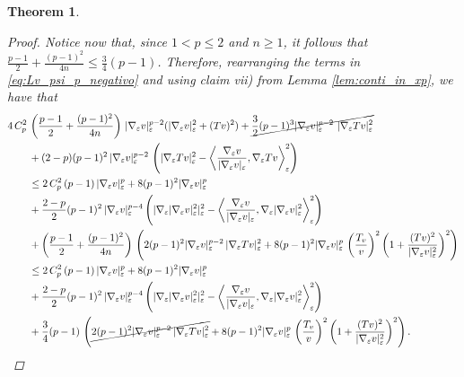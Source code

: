 \documentclass[10pt]{amsart}
\numberwithin{equation}{section}
\newtheorem{theorem}{Theorem}[section]
\theoremstyle{definition}
\begin{document}
\begin{theorem}
\begin{proof}
Notice now that, since $1<p \leq 2$ and $n\geq 1$, it follows that $\tfrac{p-1}{2} + \tfrac{(p-1)^{2}}{4n} \leq \tfrac{3}{4}(p-1)$. Therefore, rearranging the terms in \eqref{eq:Lv_psi_p_negativo} and using claim vii) from Lemma \ref{lem:conti_in_xp}, we have that
		\begin{equation}\label{eq:Rearranging}
			\begin{aligned}
				4\, C_{p}^{2}\, &\left(\dfrac{p-1}{2} + \dfrac{(p-1)^2}{4n}\right)\,  |\nabla_{\varepsilon}v|_{\varepsilon}^{p-2}(|\nabla_{\varepsilon}v|_{\varepsilon}^{2}+(Tv)^2) + \cancel{\dfrac{3}{2}(p-1)^{3}|\nabla_{\varepsilon}v|_{\varepsilon}^{p-2} \,\, |\nabla_{\varepsilon}T v|_{\varepsilon}^2} \\
				&+ (2-p)(p-1)^2 \, |\nabla_{\varepsilon}v|_{\varepsilon}^{p-2} \, \left(|\nabla_{\varepsilon}T v|_{\varepsilon}^2 - \left\langle \dfrac{\nabla_{\varepsilon}v}{|\nabla_{\varepsilon}v|_{\varepsilon}}, \nabla_{\varepsilon}T v \right\rangle^{2}_{\varepsilon}\right)\\
				&\leq 2 \, C_{p}^{2} \, (p-1) \, |\nabla_{\varepsilon}v|_{\varepsilon}^{p} + 8 (p-1)^{2} |\nabla_{\varepsilon}v|_{\varepsilon}^p\\
				&+ \dfrac{2-p}{2}(p-1)^{2}\, |\nabla_{\varepsilon}v|_{\varepsilon}^{p-4} \left(|\nabla_{\varepsilon}|\nabla_{\varepsilon}v|_{\varepsilon}^2|^2_{\varepsilon} - \left\langle \dfrac{\nabla_{\varepsilon}v}{|\nabla_{\varepsilon}v|_{\varepsilon}}, \nabla_{\varepsilon}|\nabla_{\varepsilon}v|_{\varepsilon}^2 \right\rangle_{\varepsilon}^2\right)\\
				&+ \left(\dfrac{p-1}{2} + \dfrac{(p-1)^2}{4n}\right)\, \left( 2(p-1)^{2}|\nabla_{\varepsilon}v|_{\varepsilon}^{p-2}\,|\nabla_{\varepsilon}Tv|_{\varepsilon}^2 + 8(p-1)^{2}|\nabla_{\varepsilon}v|_{\varepsilon}^{p}\,  \left(\dfrac{T_v}{v}\right)^2 \left(1+ \dfrac{(Tv)^2}{|\nabla_{\varepsilon}v|_{\varepsilon}^2}\right)^{2}\right)\\
				&\leq 2 \, C_{p}^{2} \, (p-1) \, |\nabla_{\varepsilon}v|_{\varepsilon}^{p} + 8 (p-1)^{2} |\nabla_{\varepsilon}v|_{\varepsilon}^p\\
				&+ \dfrac{2-p}{2}(p-1)^{2}\, |\nabla_{\varepsilon}v|_{\varepsilon}^{p-4} \left(|\nabla_{\varepsilon}|\nabla_{\varepsilon}v|_{\varepsilon}^2|^2_{\varepsilon} - \left\langle \dfrac{\nabla_{\varepsilon}v}{|\nabla_{\varepsilon}v|_{\varepsilon}}, \nabla_{\varepsilon}|\nabla_{\varepsilon}v|_{\varepsilon}^2 \right\rangle_{\varepsilon}^2\right)\\
				&+  \dfrac{3}{4}(p-1)\, \left( \cancel{2(p-1)^{2}|\nabla_{\varepsilon}v|_{\varepsilon}^{p-2}\,|\nabla_{\varepsilon}Tv|_{\varepsilon}^2} + 8(p-1)^{2}|\nabla_{\varepsilon}v|_{\varepsilon}^{p}\,  \left(\dfrac{T_v}{v}\right)^2 \left(1+ \dfrac{(Tv)^2}{|\nabla_{\varepsilon}v|_{\varepsilon}^2}\right)^{2}\right).

\end{aligned}
\end{equation}
\end{proof}
\end{theorem}
\end{document}
